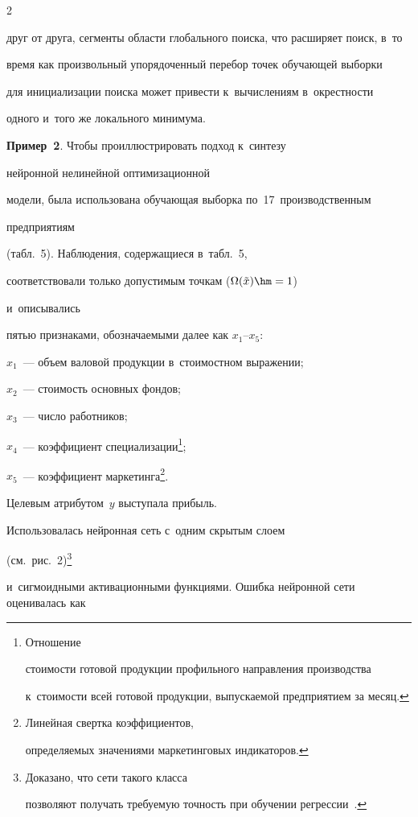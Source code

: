 \begin{multicols}{2}
\begin{enumerate}[1.]
друг от друга, сегменты области глобального поиска, что  расширяет поиск, в~то 


время как произвольный упорядоченный перебор точек обучающей выборки 


для инициализации  поиска может привести к~вычислениям в~окрест\-ности 


одного и~того же локального минимума.


\end{enumerate}





\noindent


\textbf{Пример~2}. Чтобы проиллюстрировать подход к~синтезу 


нейронной нелинейной оптимизационной


модели, была использована обучающая выборка по~17~производственным 


предприятиям 


(табл.~5). Наблюдения,  содержащиеся в~табл.~5,


 соответствовали  только допустимым точкам  ($\Omega(\tilde{x})\hm=1$) 


 и~описывались


пятью признаками, обозначаемыми далее как  $x_1$--$x_5$:


$x_1$~--- объем валовой продукции в~стоимостном выражении;


$x_2$~--- стоимость основных фондов;


$x_3$~--- число работников;


$x_4$~--- коэффициент специализации\footnote{Отношение 


стоимости готовой продукции профильного направления производства 


к~стоимости всей готовой продукции, выпускаемой предприятием за месяц.};


$x_5$~--- коэффициент маркетинга\footnote{Линейная свертка коэффициентов, 


определяемых значениями маркетинговых индикаторов.}.


Целевым атрибутом~$y$  выступала прибыль.


Использовалась нейронная сеть с~одним скрытым слоем 


(см.\ рис.~2)\footnote{Доказано, что сети  такого класса 


позволяют получать требуемую точность при обучении регрессии~\cite{13-don}.} 


и~сигмоидными активационными функциями. Ошибка нейронной сети оценивалась как



\end{multicols}
